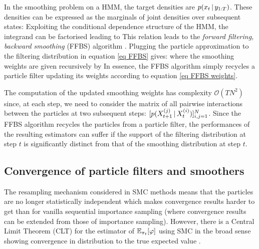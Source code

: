 In the smoothing problem on a HMM, the target densities are $p(x_t\,|\, y_{1:T})$. These densities can be expressed as the marginals of joint densities over subsequent states: 
 Exploiting the conditional dependence structure of the HMM, the integrand can be factorised leading to
This relation leads to the \emph{forward filtering, backward smoothing} (FFBS) algorithm \citep{hurzeler98, doucet00}.
Plugging the particle approximation to the filtering distribution in equation \eqref{eq FFBS} gives:
where the smoothing weights are given recursively by
In essence, the FFBS algorithm simply recycles a particle filter updating its weights according to equation \eqref{eq FFBS weights}. 

The computation of the updated smoothing weights has complexity $\mathcal O(TN^{2})$ since, at each step, we need to consider the matrix of all pairwise interactions between the particles at two subsequent steps: $[p(X^{(j)}_{t+1}\,|\, X^{(i)}_{t})]_{i,j=1}^{N}$. Since the FFBS algorithm recycles the particles from a particle filter, the performances of the resulting estimators can suffer if the support of the filtering distribution at step $t$ is significantly distinct from that of the smoothing distribution at step $t$.

\subsection{Convergence of particle filters and smoothers}

The resampling mechanism considered in SMC methods means that the particles are no longer statistically independent which makes convergence results harder to get than for vanilla sequential importance sampling (where convergence results can be extended from those of importance sampling).
However, there is a Central Limit Theorem (CLT) for the estimator of $\mathbb E_{\pi_{t}}[\varphi]$ using SMC in the broad sense showing convergence in distribution to the true expected value \citep{chopin04}.

